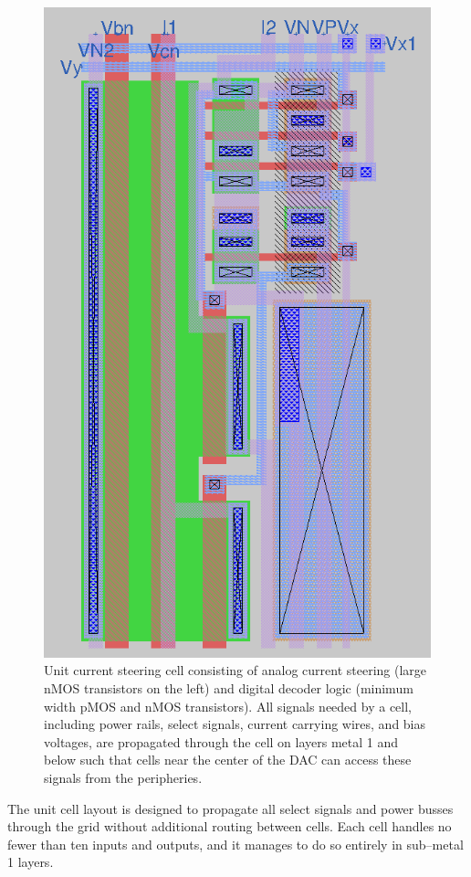 \documentclass{article}
\begin{document}
\begin{figure}[H]
    \centering{}
    \includegraphics[width=0.7\columnwidth]{images/current_steering_unit_cell_layout.png}
    \caption{Unit current steering cell consisting of analog current steering (large nMOS transistors on the left) and digital decoder logic (minimum width pMOS and nMOS transistors). All signals needed by a cell, including power rails, select signals, current carrying wires, and bias voltages, are propagated through the cell on layers metal 1 and below such that cells near the center of the DAC can access these signals from the peripheries.}
    \label{fig:unit_cell_layout}
\end{figure}

The unit cell layout is designed to propagate all select signals and power busses through the grid without additional routing between cells. Each cell handles no fewer than ten inputs and outputs, and it manages to do so entirely in sub–metal 1 layers.
\end{document}
